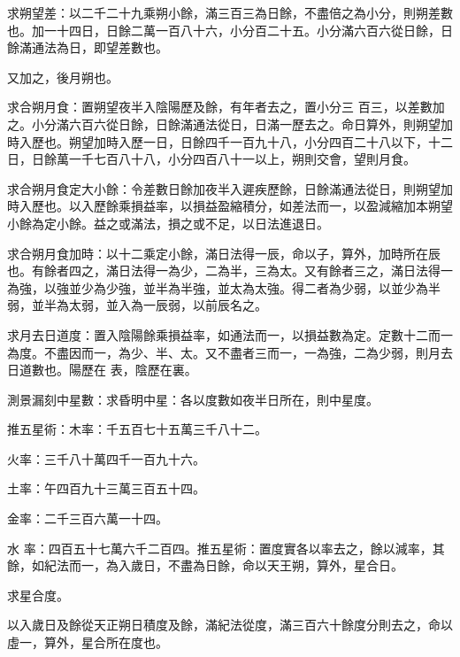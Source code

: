 \begin{pinyinscope}
 求朔望差：以二千二十九乘朔小餘，滿三百三為日餘，不盡倍之為小分，則朔差數也。加一十四日，日餘二萬一百八十六，小分百二十五。小分滿六百六從日餘，日餘滿通法為日，即望差數也。



 又加之，後月朔也。



 求合朔月食：置朔望夜半入陰陽歷及餘，有年者去之，置小分三
 百三，以差數加之。小分滿六百六從日餘，日餘滿通法從日，日滿一歷去之。命日算外，則朔望加時入歷也。朔望加時入歷一日，日餘四千一百九十八，小分四百二十八以下，十二日，日餘萬一千七百八十八，小分四百八十一以上，朔則交會，望則月食。



 求合朔月食定大小餘：令差數日餘加夜半入遲疾歷餘，日餘滿通法從日，則朔望加時入歷也。以入歷餘乘損益率，以損益盈縮積分，如差法而一，以盈減縮加本朔望小餘為定小餘。益之或滿法，損之或不足，以日法進退日。



 求合朔月食加時：以十二乘定小餘，滿日法得一辰，命以子，算外，加時所在辰也。有餘者四之，滿日法得一為少，二為半，三為太。又有餘者三之，滿日法得一為強，以強並少為少強，並半為半強，並太為太強。得二者為少弱，以並少為半弱，並半為太弱，並入為一辰弱，以前辰名之。



 求月去日道度：置入陰陽餘乘損益率，如通法而一，以損益數為定。定數十二而一為度。不盡因而一，為少、半、太。又不盡者三而一，一為強，二為少弱，則月去日道數也。陽歷在
 表，陰歷在裏。



 測景漏刻中星數：求昏明中星：各以度數如夜半日所在，則中星度。



 推五星術：木率：千五百七十五萬三千八十二。



 火率：三千八十萬四千一百九十六。



 土率：午四百九十三萬三百五十四。



 金率：二千三百六萬一十四。



 水
 率：四百五十七萬六千二百四。推五星術：置度實各以率去之，餘以減率，其餘，如紀法而一，為入歲日，不盡為日餘，命以天王朔，算外，星合日。



 求星合度。



 以入歲日及餘從天正朔日積度及餘，滿紀法從度，滿三百六十餘度分則去之，命以虛一，算外，星合所在度也。




\end{pinyinscope}

